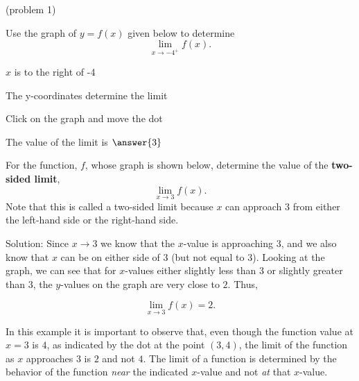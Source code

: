 \documentclass[handout]{ximera}
\begin{document}
\begin{problem}(problem 1)




Use the graph of $y = f(x)$ given below to determine
  \[
  \lim_{x\to -4^+} f(x).
  \]
  
    \begin{hint}
      $x$ is to the right of -4
    \end{hint}
    \begin{hint}
      The y-coordinates determine the limit
    \end{hint}
		\begin{hint}
		  Click on the graph and move the dot
		\end{hint}
		The value of the limit is
		 $\answer{3}$

\end{problem}


\begin{example}[example 2]
For the function, $f$, whose graph is shown below, determine the value of the \textbf{two-sided limit}, 
\[
\lim_{x\to 3} f(x).
\]
Note that this is called a two-sided limit because $x$ can 
approach $3$ from either the left-hand side or the right-hand side.



\vspace{.25in}
Solution: Since $x \to 3$ we know that the $x$-value is approaching $3$, and we also know 
that $x$ can be on either side of $3$ (but not equal to 3). 
Looking at the graph, we can see that for $x$-values either slightly less than $3$ or slightly greater than $3$, 
the $y$-values on the graph are very close to $2$. Thus, 

\[
\lim_{x\to 3} f(x) = 2.
\]

In this example it is important to observe that, even though the function value at $x= 3$ is $4$, 
as indicated by the dot at the point $(3,4)$, the limit of the function as $x$ approaches $3$ is $2$ and not $4$.  
The limit of a function is determined by the behavior of the function \textit{near} the 
indicated $x$-value and not \textit{at} that $x$-value.\\

\end{example}
\end{document}
